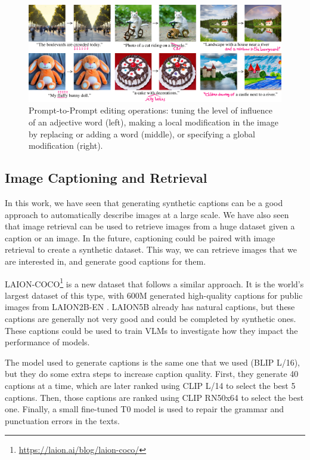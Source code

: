 \begin{figure}[ht]
    \centering
    \includegraphics[width=\linewidth]{images/future/prompt-to-prompt.png}
    \caption{Prompt-to-Prompt editing operations: tuning the level of influence of an adjective word (left), making a local modification in the image by replacing or adding a word (middle), or specifying a global modification (right).}
    \label{fig:prompt-to-prompt}
\end{figure}

\subsection{Image Captioning and Retrieval}

In this work, we have seen that generating synthetic captions can be a good approach to automatically describe images at a large scale. We have also seen that image retrieval can be used to retrieve images from a huge dataset given a caption or an image. In the future, captioning could be paired with image retrieval to create a synthetic dataset. This way, we can retrieve images that we are interested in, and generate good captions for them.

LAION-COCO\footnote{\url{https://laion.ai/blog/laion-coco/}} is a new dataset that follows a similar approach. It is the world’s largest dataset of this type, with 600M generated high-quality captions for public images from LAION2B-EN \cite{schuhmann2022laionb}. LAION5B already has natural captions, but these captions are generally not very good and could be completed by synthetic ones. These captions could be used to train VLMs to investigate how they impact the performance of models.

The model used to generate captions is the same one that we used (BLIP L/16), but they do some extra steps to increase caption quality. First, they generate 40 captions at a time, which are later ranked using CLIP L/14 to select the best 5 captions. Then, those captions are ranked using CLIP RN50x64 to select the best one. Finally, a small fine-tuned T0 model is used to repair the grammar and punctuation errors in the texts.

